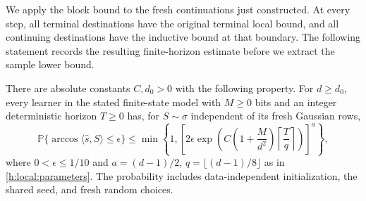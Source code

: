 We apply the block bound to the fresh continuations just constructed.
At every step, all terminal destinations have the original terminal
local bound, and all continuing destinations have the inductive bound
at that boundary. The following statement records the resulting
finite-horizon estimate before we extract the sample lower bound.

\begin{proposition}
\label{h:stream:success}
There are absolute constants $C,d_0>0$ with the following property.
For $d\ge d_0$, every learner in the stated finite-state model with
$M\ge0$ bits and an integer deterministic horizon $T\ge0$ has, for
$S\sim\sigma$ independent of its fresh Gaussian rows,
\begin{equation}\label{h:stream:success-bound}
 \mathbb P\{\arccos\langle\widehat s,S\rangle\le\epsilon\}
 \le
 \min\left\{1,
 \left[2\epsilon\exp\!\left(
 C\left(1+\frac{M}{d^2}\right)
 \left\lceil\frac{T}{q}\right\rceil\right)\right]^a
 \right\},
\end{equation}
where $0<\epsilon\le1/10$ and
$a=(d-1)/2$, $q=\lfloor(d-1)/8\rfloor$ as in
\eqref{h:local:parameters}. The probability includes data-independent
initialization, the shared seed, and fresh random choices.
\end{proposition}


